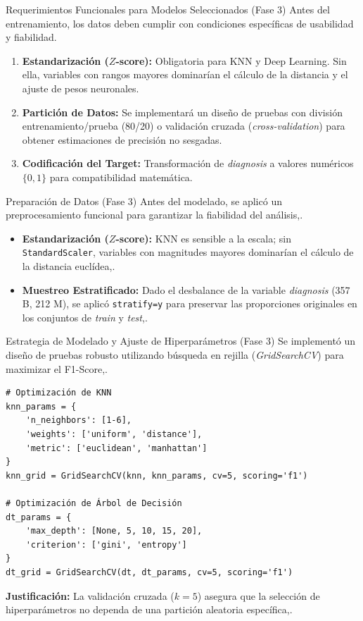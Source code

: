 \documentclass{beamer}
\begin{document}
	\begin{frame}{Requerimientos Funcionales para Modelos Seleccionados (Fase 3)}
		Antes del entrenamiento, los datos deben cumplir con condiciones específicas de usabilidad y fiabilidad.
		
		\begin{enumerate}
			\item<2-> \textbf{Estandarización ($Z$-score):} Obligatoria para KNN y Deep Learning. Sin ella, variables con rangos mayores dominarían el cálculo de la distancia y el ajuste de pesos neuronales.
			\item<3-> \textbf{Partición de Datos:} Se implementará un diseño de pruebas con división entrenamiento/prueba (80/20) o validación cruzada (\textit{cross-validation}) para obtener estimaciones de precisión no sesgadas.
			\item<4-> \textbf{Codificación del Target:} Transformación de \textit{diagnosis} a valores numéricos $\{0, 1\}$ para compatibilidad matemática.
		\end{enumerate}
	\end{frame}
	
	\begin{frame}{Preparación de Datos (Fase 3)}
		Antes del modelado, se aplicó un preprocesamiento funcional para garantizar la fiabilidad del análisis,.
		
		\begin{itemize}
			\item<2-> \textbf{Estandarización ($Z$-score):} KNN es sensible a la escala; sin \texttt{StandardScaler}, variables con magnitudes mayores dominarían el cálculo de la distancia euclídea,.
			\item<3-> \textbf{Muestreo Estratificado:} Dado el desbalance de la variable \textit{diagnosis} (357 B, 212 M), se aplicó \texttt{stratify=y} para preservar las proporciones originales en los conjuntos de \textit{train} y \textit{test},.
		\end{itemize}
	\end{frame}
	
	\begin{frame}[fragile]{Estrategia de Modelado y Ajuste de Hiperparámetros (Fase 3)}
		Se implementó un diseño de pruebas robusto utilizando búsqueda en rejilla (\textit{GridSearchCV}) para maximizar el F1-Score,.
		
		\begin{lstlisting}[style=colab]
# Optimización de KNN
knn_params = {
	'n_neighbors': [1-6],
	'weights': ['uniform', 'distance'],
	'metric': ['euclidean', 'manhattan']
}
knn_grid = GridSearchCV(knn, knn_params, cv=5, scoring='f1')

# Optimización de Árbol de Decisión
dt_params = {
	'max_depth': [None, 5, 10, 15, 20],
	'criterion': ['gini', 'entropy']
}
dt_grid = GridSearchCV(dt, dt_params, cv=5, scoring='f1')
		\end{lstlisting}
		\textbf{Justificación:} La validación cruzada ($k=5$) asegura que la selección de hiperparámetros no dependa de una partición aleatoria específica,.
	\end{frame}
	
\end{document}
